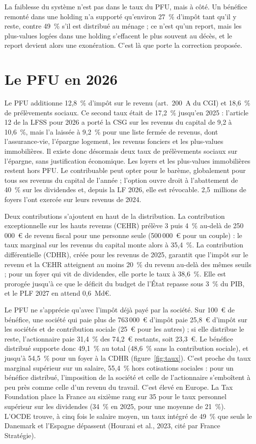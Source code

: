 \documentclass[11pt,a4paper]{article}
\begin{document}
La faiblesse du système n'est pas dans le taux du PFU, mais à côté. Un bénéfice remonté dans une holding n'a
supporté qu'environ 27~\% d'impôt tant qu'il y reste, contre 49~\% s'il est distribué au ménage ; ce n'est
qu'un report, mais les plus-values logées dans une holding s'effacent le plus souvent au décès, et le report
devient alors une exonération. C'est là que porte la correction
proposée.

\section{Le PFU en 2026}

Le PFU additionne 12,8~\% d'impôt sur le revenu (art.~200~A du CGI) et 18,6~\% de prélèvements sociaux. Ce
second taux était de 17,2~\% jusqu'en 2025 : l'article 12 de la LFSS pour 2026 a porté la CSG sur les revenus
du capital de 9,2 à 10,6~\%, mais l'a laissée à 9,2~\% pour une liste fermée de revenus, dont l'assurance-vie,
l'épargne logement, les revenus fonciers et les plus-values immobilières. Il existe donc désormais deux taux
de prélèvements sociaux sur l'épargne, sans justification économique. Les loyers et les plus-values
immobilières restent hors PFU. Le contribuable peut opter pour le barème, globalement pour tous ses revenus
du capital de l'année ; l'option ouvre droit à l'abattement de 40~\% sur les dividendes et, depuis la LF
2026, elle est révocable. 2,5~millions de foyers l'ont exercée sur leurs revenus de 2024.

Deux contributions s'ajoutent en haut de la distribution. La contribution exceptionnelle sur les hauts
revenus (CEHR) prélève 3 puis 4~\% au-delà de 250\,000~€ de revenu fiscal pour une personne seule
(500\,000~€ pour un couple) : le taux marginal sur les revenus du capital monte alors à 35,4~\%. La
contribution différentielle (CDHR), créée pour les revenus de 2025, garantit que l'impôt sur le revenu et la
CEHR atteignent au moins 20~\% du revenu au-delà des mêmes seuils ; pour un foyer qui vit de dividendes,
elle porte le taux à 38,6~\%. Elle est prorogée jusqu'à ce que le déficit du budget de l'État repasse sous 3~\% du PIB, et
le PLF 2027 en attend 0,6~Md€.

Le PFU ne s'apprécie qu'avec l'impôt déjà payé par la société. Sur 100~€ de bénéfice, une société qui paie plus
de 763\,000~€ d'impôt paie 25,8~€ d'impôt sur les sociétés et de contribution sociale (25~€ pour les autres) ; si elle distribue le reste,
l'actionnaire paie 31,4~\% des 74,2~€ restants, soit 23,3~€. Le bénéfice distribué supporte donc 49,1~\% au
total (48,6~\% sans la contribution sociale), et jusqu'à 54,5~\% pour un foyer à la CDHR
(figure~\ref{fig:taux}). C'est proche du taux marginal
supérieur sur un salaire, 55,4~\% hors cotisations sociales : pour un bénéfice distribué, l'imposition de la
société et celle de l'actionnaire s'emboîtent à peu près comme celle d'un revenu du travail. C'est élevé en
Europe. La Tax Foundation place la France au sixième rang sur 35 pour le taux personnel supérieur sur les
dividendes (34~\% en 2025, pour une moyenne de 21~\%). L'OCDE trouve, à cinq fois le salaire moyen, un taux
intégré de 49~\% que seuls le Danemark et l'Espagne dépassent (Hourani et al., 2023, cité par France
Stratégie).
\end{document}
